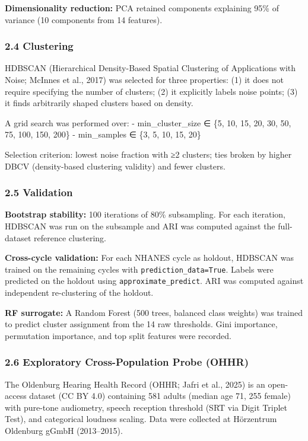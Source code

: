 \documentclass[
]{article}
\begin{document}
\textbf{Dimensionality reduction:} PCA retained components explaining 95\% of
variance (10 components from 14 features).

\subsubsection{2.4 Clustering}\label{clustering}

HDBSCAN (Hierarchical Density-Based Spatial Clustering of Applications with
Noise; McInnes et al., 2017) was selected for three properties: (1) it does not
require specifying the number of clusters; (2) it explicitly labels noise
points; (3) it finds arbitrarily shaped clusters based on density.

A grid search was performed over: - min\_cluster\_size ∈ \{5, 10, 15, 20, 30,
50, 75, 100, 150, 200\} - min\_samples ∈ \{3, 5, 10, 15, 20\}

Selection criterion: lowest noise fraction with ≥2 clusters; ties broken by
higher DBCV (density-based clustering validity) and fewer clusters.

\subsubsection{2.5 Validation}\label{validation}

\textbf{Bootstrap stability:} 100 iterations of 80\% subsampling. For each
iteration, HDBSCAN was run on the subsample and ARI was computed against the
full-dataset reference clustering.

\textbf{Cross-cycle validation:} For each NHANES cycle as holdout, HDBSCAN was
trained on the remaining cycles with \texttt{prediction\_data=True}. Labels were
predicted on the holdout using \texttt{approximate\_predict}. ARI was computed
against independent re-clustering of the holdout.

\textbf{RF surrogate:} A Random Forest (500 trees, balanced class weights) was
trained to predict cluster assignment from the 14 raw thresholds. Gini
importance, permutation importance, and top split features were recorded.

\subsubsection{2.6 Exploratory Cross-Population Probe (OHHR)}\label{external-validation-ohhr}

The Oldenburg Hearing Health Record (OHHR; Jafri et al., 2025) is an open-access
dataset (CC BY 4.0) containing 581 adults (median age 71, 255 female) with
pure-tone audiometry, speech reception threshold (SRT via Digit Triplet Test),
and categorical loudness scaling. Data were collected at Hörzentrum Oldenburg
gGmbH (2013--2015).
\end{document}
